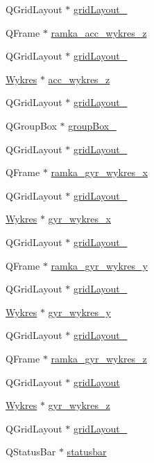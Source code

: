 \begin{DoxyCompactItemize}
Q\+Grid\+Layout $\ast$ \hyperlink{class_ui___main_window_adbbd44debcfc24db144006951bf7b3e1}{grid\+Layout\+\_}
\item 
Q\+Frame $\ast$ \hyperlink{class_ui___main_window_a192951d15c797ae1e526db04b78e8a62}{ramka\+\_\+acc\+\_\+wykres\+\_\+z}
\item 
Q\+Grid\+Layout $\ast$ \hyperlink{class_ui___main_window_a1411142737b4b7782f1a8992b19abd48}{grid\+Layout\+\_}
\item 
\hyperlink{class_wykres}{Wykres} $\ast$ \hyperlink{class_ui___main_window_af3be0fc233198da5a1a644d04abd19c3}{acc\+\_\+wykres\+\_\+z}
\item 
Q\+Grid\+Layout $\ast$ \hyperlink{class_ui___main_window_a16419b7fa6d38eb8c34d4a937c5d8ecd}{grid\+Layout\+\_}
\item 
Q\+Group\+Box $\ast$ \hyperlink{class_ui___main_window_abb28acde35ffce4d0e6152579df2cbc3}{group\+Box\+\_}
\item 
Q\+Grid\+Layout $\ast$ \hyperlink{class_ui___main_window_ab425d52d6e0cace8ff04c46eeb5e5e5a}{grid\+Layout\+\_}
\item 
Q\+Frame $\ast$ \hyperlink{class_ui___main_window_a082729b65d6da385e1b2ad5552a2c0e2}{ramka\+\_\+gyr\+\_\+wykres\+\_\+x}
\item 
Q\+Grid\+Layout $\ast$ \hyperlink{class_ui___main_window_ad497085740dc61c49aa6653a27e766b2}{grid\+Layout\+\_}
\item 
\hyperlink{class_wykres}{Wykres} $\ast$ \hyperlink{class_ui___main_window_acf5bf1518832a1508ccbff69160d36b9}{gyr\+\_\+wykres\+\_\+x}
\item 
Q\+Grid\+Layout $\ast$ \hyperlink{class_ui___main_window_a6059ebdb8007baec8371bbc86e188949}{grid\+Layout\+\_}
\item 
Q\+Frame $\ast$ \hyperlink{class_ui___main_window_aa969ae1a80d1c5c8f1fd60e54cf04a67}{ramka\+\_\+gyr\+\_\+wykres\+\_\+y}
\item 
Q\+Grid\+Layout $\ast$ \hyperlink{class_ui___main_window_a82eb42bdbffbbd70131d0f615609aa71}{grid\+Layout\+\_}
\item 
\hyperlink{class_wykres}{Wykres} $\ast$ \hyperlink{class_ui___main_window_ac3c76ef08ae3649c6982222e1574efd1}{gyr\+\_\+wykres\+\_\+y}
\item 
Q\+Grid\+Layout $\ast$ \hyperlink{class_ui___main_window_af4087464c94fd7558faa5fbf4bceea9f}{grid\+Layout\+\_}
\item 
Q\+Frame $\ast$ \hyperlink{class_ui___main_window_a01282b219850189843753e40892c1df5}{ramka\+\_\+gyr\+\_\+wykres\+\_\+z}
\item 
Q\+Grid\+Layout $\ast$ \hyperlink{class_ui___main_window_a525ed3c5fe0784ac502ee222fba4e205}{grid\+Layout}
\item 
\hyperlink{class_wykres}{Wykres} $\ast$ \hyperlink{class_ui___main_window_aa9147c57fbce552eb01e7b10c52efeab}{gyr\+\_\+wykres\+\_\+z}
\item 
Q\+Grid\+Layout $\ast$ \hyperlink{class_ui___main_window_a618fbd9c562e71fa5080c5baa3d0a78e}{grid\+Layout\+\_}
\item 
Q\+Status\+Bar $\ast$ \hyperlink{class_ui___main_window_a1687cceb1e2787aa1f83e50433943a91}{statusbar}
\end{DoxyCompactItemize}


